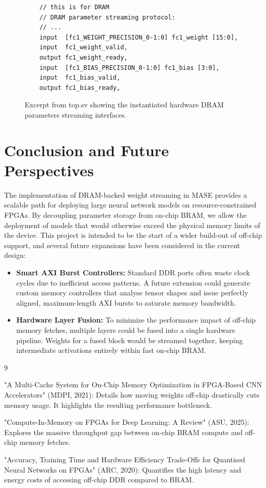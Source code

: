 \documentclass[11pt,a4paper]{article}
\begin{document}
\begin{figure}[h]
\begin{verbatim}
    // this is for DRAM
    // DRAM parameter streaming protocol:
    // ...
    input  [fc1_WEIGHT_PRECISION_0-1:0] fc1_weight [15:0],
    input  fc1_weight_valid,
    output fc1_weight_ready,
    input  [fc1_BIAS_PRECISION_0-1:0] fc1_bias [3:0],
    input  fc1_bias_valid,
    output fc1_bias_ready,
\end{verbatim}
    \caption{Excerpt from top.sv showing the instantiated hardware DRAM parameters streaming interfaces.}
    \label{fig:code_snippet}
\end{figure}

\section{Conclusion and Future Perspectives}

The implementation of DRAM-backed weight streaming in MASE provides a scalable
path for deploying large neural network models on resource-constrained FPGAs.
By decoupling parameter storage from on-chip BRAM, we allow the deployment of
models that would otherwise exceed the physical memory limits of the device.
This project is intended to be the start of a wider build-out of off-chip
support, and several future expansions have been considered in the current
design:

\begin{itemize}
    \item \textbf{Smart AXI Burst Controllers:} Standard DDR ports often waste
    clock cycles due to inefficient access patterns. A future extension could
    generate custom memory controllers that analyse tensor shapes and issue
    perfectly aligned, maximum-length AXI bursts to saturate memory bandwidth.
    \item \textbf{Hardware Layer Fusion:} To minimize the performance impact of
    off-chip memory fetches, multiple layers could be fused into a single
    hardware pipeline. Weights for a fused block would be streamed together,
    keeping intermediate activations entirely within fast on-chip BRAM.
\end{itemize}

\begin{thebibliography}{9}

"A Multi-Cache System for On-Chip Memory Optimization in FPGA-Based CNN Accelerators" (MDPI, 2021): Details how moving weights off-chip drastically cuts memory usage. It highlights the resulting performance bottleneck.

"Compute-In-Memory on FPGAs for Deep Learning: A Review" (ASU, 2025): Explores the massive throughput gap between on-chip BRAM compute and off-chip memory fetches.

"Accuracy, Training Time and Hardware Efficiency Trade-Offs for Quantised Neural Networks on FPGAs" (ARC, 2020): Quantifies the high latency and energy costs of accessing off-chip DDR compared to BRAM.

\end{thebibliography}
\end{document}
